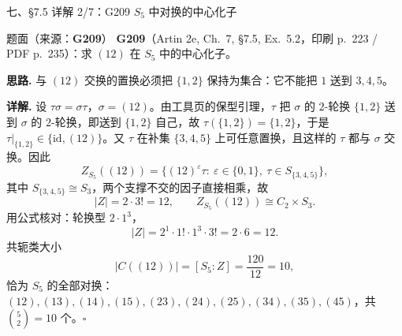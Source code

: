 \documentclass[aspectratio=169,10pt,fontset=none]{ctexbeamer}
\newcommand{\ex}[1]{\textcolor{accent}{\footnotesize\bfseries #1}}
\newcommand{\key}[1]{\textcolor{ink}{\bfseries #1}}
\begin{document}
\begin{frame}[t]{七、\S7.5 详解 2/7：G209 $S_5$ 中对换的中心化子}
\label{ex:G209}
\scriptsize
\begin{block}{\footnotesize 题面（来源：\ex{G209}）}
\scriptsize
\ex{G209}（Artin 2e, Ch.~7, \S7.5, Ex.~5.2，印刷 p.~223 / PDF p.~235）：求 $(12)$ 在 $S_5$ 中的中心化子。
\end{block}
\key{思路.} 与 $(12)$ 交换的置换必须把 $\{1,2\}$ 保持为集合：它不能把 $1$ 送到 $3,4,5$。

\key{详解.} 设 $\tau\sigma=\sigma\tau$，$\sigma=(12)$。由工具页的保型引理，$\tau$ 把 $\sigma$ 的 $2$-轮换 $\{1,2\}$ 送到 $\sigma$ 的 $2$-轮换，即送到 $\{1,2\}$ 自己，故 $\tau(\{1,2\})=\{1,2\}$，于是 $\tau|_{\{1,2\}}\in\{\mathrm{id},(12)\}$。又 $\tau$ 在补集 $\{3,4,5\}$ 上可任意置换，且这样的 $\tau$ 都与 $\sigma$ 交换。因此
\[ Z_{S_5}((12))=\bigl\{(12)^{\varepsilon}\tau:\ \varepsilon\in\{0,1\},\ \tau\in S_{\{3,4,5\}}\bigr\}, \]
其中 $S_{\{3,4,5\}}\cong S_3$，两个支撑不交的因子直接相乘，故
\[ |Z|=2\cdot3!=12,\qquad Z_{S_5}((12))\cong C_2\times S_3. \]
用公式核对：轮换型 $2\cdot1^3$，
\[ |Z|=2^1\cdot1!\cdot1^3\cdot3!=2\cdot6=12. \]
共轭类大小
\[ |C((12))|=[S_5:Z]=\frac{120}{12}=10, \]
恰为 $S_5$ 的全部对换：$(12),(13),(14),(15),(23),(24),(25),(34),(35),(45)$，共 $\binom52=10$ 个。$\square$
\end{frame}
\end{document}
